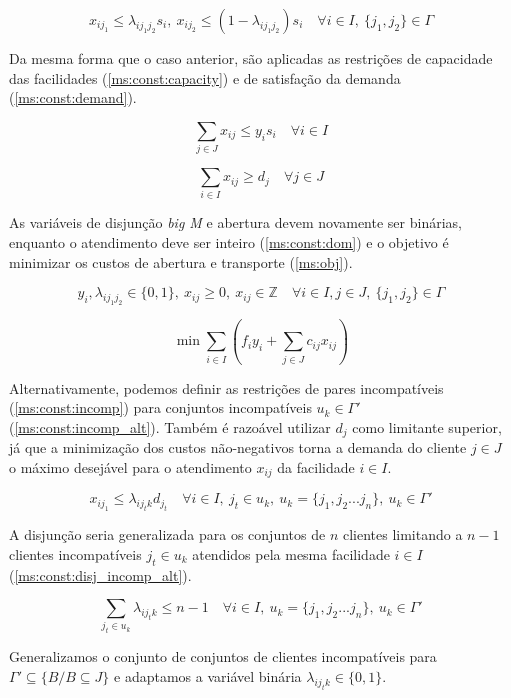 \documentclass[]{article}
\begin{document}
	\begin{equation}
		\label{ms:const:incomp}		
		x_{ij_1} \le \lambda_{ij_1j_2} s_i, 
		\ x_{ij_2} \le (1 - \lambda_{ij_1j_2}) s_i 
		\quad
		\forall i \in I, 
		\ \{ j_1, j_2 \} \in \Gamma  
	\end{equation}
	
	Da mesma forma que o caso anterior, são aplicadas as restrições de capacidade das facilidades (\ref{ms:const:capacity}) e de satisfação da demanda (\ref{ms:const:demand}).
	
	\begin{equation}
		\label{ms:const:capacity}		
		\sum_{j \in J} x_{ij} \le y_i s_i 
		\quad
		\forall i \in I
	\end{equation}	
	
	\begin{equation}
		\label{ms:const:demand}		
		\sum_{i \in I} x_{ij} \ge d_j 
		\quad
		\forall j \in J
	\end{equation}
	
	As variáveis de disjunção \textit{big M} e abertura devem novamente ser binárias, enquanto o atendimento deve ser inteiro (\ref{ms:const:dom}) 
	e o objetivo é minimizar os custos de abertura e transporte (\ref{ms:obj}).
	
	\begin{equation}
		\label{ms:const:dom}		
		y_i, \lambda_{ij_1j_2} \in \{0, 1\}, 
		\ x_{ij} \ge 0, 
		\ x_{ij} \in \mathbb{Z}
		\quad
		\forall i \in I, j \in J, 		
		\ \{ j_1, j_2 \} \in \Gamma
	\end{equation}	
	
	\begin{equation}
		\label{ms:obj}		
		\min \sum_{i \in I} 
		(
		f_i y_i + \sum_{j \in J} c_{ij} x_{ij}
		)
	\end{equation}

	Alternativamente, podemos definir as restrições de pares incompatíveis (\ref{ms:const:incomp}) para conjuntos incompatíveis $u_k \in \Gamma'$ (\ref{ms:const:incomp_alt}). 
	Também é razoável utilizar $d_j$ como limitante superior, 
	já que a minimização dos custos não-negativos torna a demanda do cliente $j \in J$ o máximo desejável para o atendimento $x_{ij}$ da facilidade $i \in I$.   
	
	\begin{equation}
		\label{ms:const:incomp_alt}		
		x_{ij_1} \le \lambda_{ij_tk} d_{j_t} 
		\quad
		\forall i \in I, 
		\ j_t \in u_k,
		\ u_k = \{ j_1, j_2 ... j_n \},
		\ u_k \in \Gamma'  
	\end{equation}
	
	A disjunção seria generalizada para os conjuntos de $n$ clientes limitando a $n-1$ clientes incompatíveis $j_t \in u_k$ atendidos pela mesma facilidade $i \in I$ (\ref{ms:const:disj_incomp_alt}). 
	
	\begin{equation}
		\label{ms:const:disj_incomp_alt}
		\sum_{j_t \in u_k} \lambda_{ij_tk} \le n - 1 
		\quad
		\forall i \in I, 
		\ u_k = \{ j_1, j_2 ... j_n \},
		\ u_k \in \Gamma'  
	\end{equation}

	Generalizamos o conjunto de conjuntos de clientes incompatíveis para $\Gamma' \subseteq \{ B / B \subseteq J \}$ e adaptamos a variável binária $\lambda_{ij_tk} \in \{0,1\}$. 
	 
\end{document}
